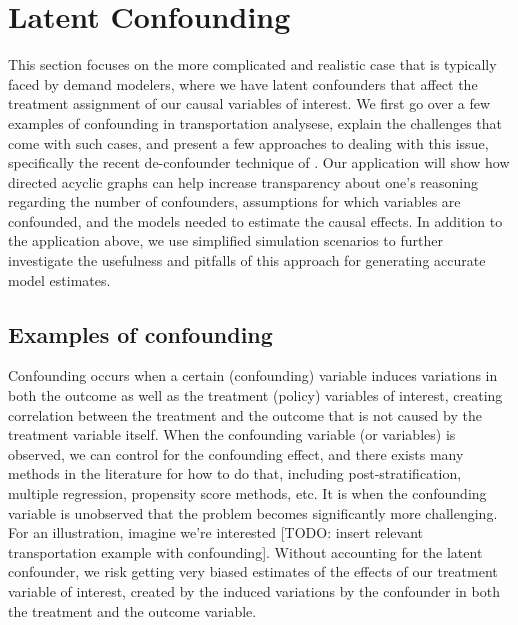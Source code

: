 \section{Latent Confounding}
\label{sec:latent-confounding}

This section focuses on the more complicated and realistic case that is 
typically faced by demand modelers, where we have latent confounders that 
affect the treatment assignment of our causal variables of interest. 
We first go over a few examples of confounding in transportation analysese, explain 
the challenges that come with such cases, and present a few approaches to 
dealing with this issue, specifically the recent de-confounder technique of 
\citet{wang_2019_blessings}. 
Our application will show how directed acyclic graphs can 
help increase transparency about one's reasoning regarding the number of 
confounders, assumptions for which variables are confounded, and the models 
needed to estimate the causal effects. 
In addition to the application above, we use simplified simulation scenarios to further investigate the usefulness 
and pitfalls of this approach for generating accurate model estimates. 


\subsection{Examples of confounding}
\label{sec:confounding-examples}

Confounding occurs when a certain (confounding) variable induces variations in
both the outcome as well as the treatment (policy) variables of interest, 
creating correlation between the treatment and the outcome that is not caused
by the treatment variable itself. When the confounding variable (or variables) is 
observed, we can control for the confounding effect, and there exists many 
methods in the literature for how to do that, including post-stratification,
multiple regression, propensity score methods, etc. It is when the 
confounding variable is unobserved that the problem becomes significantly 
more challenging. For an illustration, imagine we're interested [TODO: 
insert relevant transportation example with confounding]. Without 
accounting for the latent confounder, we risk getting very biased estimates 
of the effects of our treatment variable of interest, created by the 
induced variations by the confounder in both the treatment and the outcome 
variable. 



